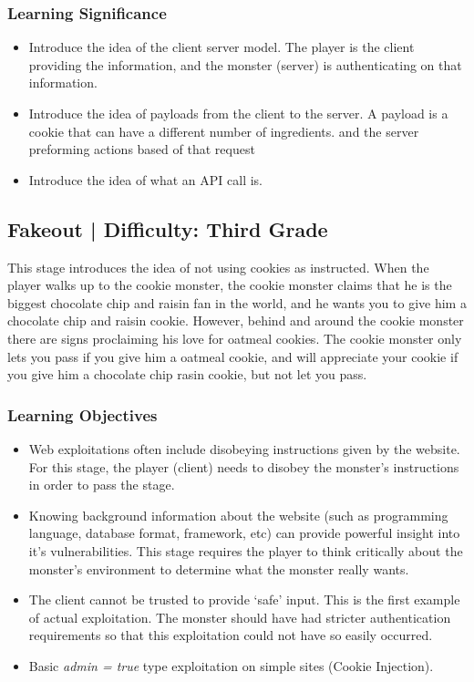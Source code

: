 \documentclass{article}
\begin{document}
\subsubsection{Learning Significance}

\begin{itemize}
  \item Introduce the idea of the client server model. The player is the client
  providing the information, and the monster (server) is authenticating on that information.
  \item Introduce the idea of payloads from the client to the server. A payload
  is a cookie that can have a different number of ingredients.
    and the server preforming actions based of that request
  \item Introduce the idea of what an API call is.
\end{itemize}

\subsection{Fakeout | Difficulty: Third Grade}
This stage introduces the idea of not using cookies as
instructed. When the player walks up to the cookie monster, the cookie monster claims
that he is the biggest chocolate chip and raisin fan in the world, and
he wants you to give him a chocolate chip and raisin cookie. However, behind
and around the cookie monster there are signs proclaiming his love for
oatmeal cookies. The cookie monster only lets you pass if you give him
a oatmeal cookie, and will appreciate your cookie if you give him a
chocolate chip rasin cookie, but not let you pass.

\subsubsection{Learning Objectives}

\begin{itemize}
  \item Web exploitations often include disobeying instructions given by the website.
  For this stage, the player (client) needs to disobey the monster's instructions in order
  to pass the stage.
  \item Knowing background information about the website (such as
programming language, database format, framework, etc) can provide powerful
insight into it's vulnerabilities. This stage requires the player to think critically about
the monster's environment to determine what the monster really wants.
  \item The client cannot be trusted to provide `safe' input. This is the first example
  of actual exploitation. The monster should have had stricter authentication requirements
  so that this exploitation could not have so easily occurred.
  \item Basic \textit{admin = true} type exploitation on simple sites (Cookie Injection).
\end{itemize}
\end{document}
